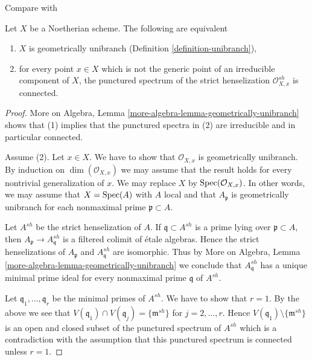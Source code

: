 \begin{lemma}
\label{lemma-geometrically-unibranch}
\begin{reference}
Compare with \cite[Proposition 2.3]{Etale-coverings}
\end{reference}
Let $X$ be a Noetherian scheme. The following are equivalent
\begin{enumerate}
\item $X$ is geometrically unibranch (Definition \ref{definition-unibranch}),
\item for every point $x \in X$ which is not the generic point of
an irreducible component of $X$, the punctured spectrum of the
strict henselization $\mathcal{O}_{X, x}^{sh}$ is connected.
\end{enumerate}
\end{lemma}

\begin{proof}
More on Algebra, Lemma \ref{more-algebra-lemma-geometrically-unibranch}
shows that (1) implies that the punctured spectra in (2) are
irreducible and in particular connected.

\medskip\noindent
Assume (2). Let $x \in X$. We have to show that $\mathcal{O}_{X, x}$
is geometrically unibranch. By induction on $\dim(\mathcal{O}_{X, x})$
we may assume that the result holds for every nontrivial generalization of $x$.
We may replace $X$ by $\mathop{\mathrm{Spec}}(\mathcal{O}_{X, x})$. In other words,
we may assume that $X = \mathop{\mathrm{Spec}}(A)$ with $A$ local and that
$A_\mathfrak p$ is geometrically unibranch for each nonmaximal
prime $\mathfrak p \subset A$.

\medskip\noindent
Let $A^{sh}$ be the strict henselization of $A$. If
$\mathfrak q \subset A^{sh}$ is a prime lying over $\mathfrak p \subset A$,
then $A_\mathfrak p \to A^{sh}_\mathfrak q$ is a
filtered colimit of \'etale algebras. Hence the strict henselizations of
$A_\mathfrak p$ and $A^{sh}_\mathfrak q$ are isomorphic.
Thus by More on Algebra, Lemma \ref{more-algebra-lemma-geometrically-unibranch}
we conclude that $A^{sh}_\mathfrak q$
has a unique minimal prime ideal for every nonmaximal prime $\mathfrak q$ of
$A^{sh}$.

\medskip\noindent
Let $\mathfrak q_1, \ldots, \mathfrak q_r$ be the minimal primes
of $A^{sh}$. We have to show that $r = 1$. By the above
we see that $V(\mathfrak q_1) \cap V(\mathfrak q_j) = \{\mathfrak m^{sh}\}$
for $j = 2, \ldots, r$. Hence $V(\mathfrak q_1) \setminus \{\mathfrak m^{sh}\}$
is an open and closed subset of the punctured spectrum of $A^{sh}$
which is a contradiction with the assumption that this punctured spectrum
is connected unless $r = 1$.
\end{proof}

